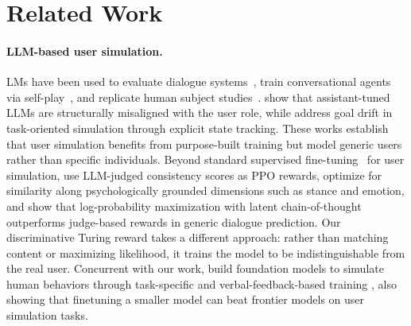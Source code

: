 \documentclass[11pt]{article}
\begin{document}
\section{Related Work}

\paragraph{LLM-based user simulation.}
LMs have been used to evaluate dialogue systems~\citep{davidson2023user, sekulic2024simulating, sim2real, humt}, train conversational agents via self-play~\citep{shah2018bootstrapping, abdulhai2025consistently, utility}, and replicate human subject studies~\citep{aher2023using, park2023generative}. \citet{naous2025flipping} show that assistant-tuned LLMs are structurally misaligned with the user role, while \citet{mehri2025goal} address goal drift in task-oriented simulation through explicit state tracking. These works establish that user simulation benefits from purpose-built training but model generic users rather than specific individuals.
Beyond standard supervised fine-tuning~\citep{wolf2019transfertransfo} for user simulation, \citet{abdulhai2025consistently} use LLM-judged consistency scores as PPO rewards, \citet{wu2026humanlm} optimize for similarity along psychologically grounded dimensions such as stance and emotion, and \citet{gandhi2026dialogue} show that log-probability maximization with latent chain-of-thought outperforms judge-based rewards in generic dialogue prediction. Our discriminative Turing reward takes a different approach: rather than matching content or maximizing likelihood, it trains the model to be indistinguishable from the real user. Concurrent with our work, \citet{OdysSim} build foundation models to simulate human behaviors through task-specific and verbal-feedback-based training \citep{verbal_feedback}, also showing that finetuning a smaller model can beat frontier models on user simulation tasks.
\end{document}
